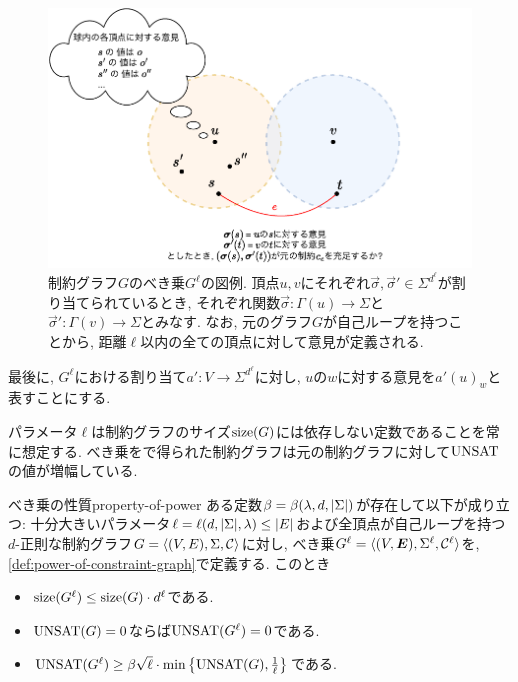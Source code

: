 \begin{figure}[ht]
  \centering
  \includegraphics[width=\textwidth]{images/gap_amplification.pdf}
  \caption{制約グラフ$G$のべき乗$G^\ell$の図例. 頂点$u,v$にそれぞれ$\vec{\sigma},\vec{\sigma}'\in\Sigma^{d^{\ell}}$が割り当てられているとき, それぞれ関数$\vec{\sigma}\colon \Gamma(u)\to\Sigma$と$\vec{\sigma}'\colon \Gamma(v)\to\Sigma$とみなす. なお, 元のグラフ$G$が自己ループを持つことから, 距離$\ell$以内の全ての頂点に対して意見が定義される.\label{fig:gap-amplification}}
\end{figure}

最後に, $G^\ell$における割り当て$a'\colon V\to\Sigma^{d^{\ell}}$に対し, $u$の$w$に対する意見を$a'(u)_w$と表すことにする.

パラメータ$\ell$は制約グラフのサイズ$\mathrm{size}(G)$には依存しない定数であることを常に想定する.
べき乗をで得られた制約グラフは元の制約グラフに対して$\mathrm{UNSAT}$の値が増幅している.

\begin{lemma}{べき乗の性質}{property-of-power}
  ある定数$\beta=\beta(\lambda,d,\abs{\Sigma})$が存在して以下が成り立つ:
  十分大きいパラメータ$\ell=\ell(d,\abs{\Sigma},\lambda) \le \abs{E}$および全頂点が自己ループを持つ$d$-正則な制約グラフ$G=\langle(V,E),\Sigma,\mathcal{C}\rangle$に対し, べき乗$G^\ell = \langle(V,\boldsymbol{E}),\Sigma^{\ell},\mathcal{C}^\ell\rangle$を, \cref{def:power-of-constraint-graph}で定義する.
  このとき
  \begin{itemize}
    \item $\mathrm{size}(G^\ell) \le \mathrm{size}(G)\cdot d^\ell$である.
    \item $\mathrm{UNSAT}(G)=0$ならば$\mathrm{UNSAT}(G^\ell)=0$である.
    \item $\mathrm{UNSAT}(G^\ell) \ge \beta\sqrt{\ell}\cdot \min\qty{ \mathrm{UNSAT}(G), \frac{1}{\ell} }$である.
  \end{itemize}
\end{lemma}

